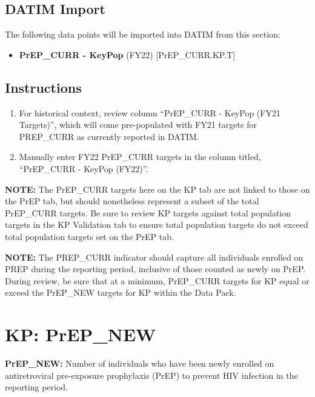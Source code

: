 \documentclass[
  openany]{book}
\providecommand{\tightlist}{%
  \setlength{\itemsep}{0pt}\setlength{\parskip}{0pt}}
\begin{document}
\hypertarget{datim-import-44}{%
\subsection{DATIM Import}\label{datim-import-44}}

The following data points will be imported into DATIM from this section:

\begin{itemize}
\tightlist
\item
  \textbf{PrEP\_CURR - KeyPop} (FY22) {[}PrEP\_CURR.KP.T{]}
\end{itemize}

\hypertarget{instructions-44}{%
\subsection{Instructions}\label{instructions-44}}

\begin{enumerate}
\def\labelenumi{\arabic{enumi}.}
\item
  For historical context, review column ``PrEP\_CURR - KeyPop (FY21
  Targets)'', which will come pre-populated with FY21 targets for
  PREP\_CURR as currently reported in DATIM.
\item
  Manually enter FY22 PrEP\_CURR targets in the column titled,
  ``PrEP\_CURR - KeyPop (FY22)''.
\end{enumerate}

\textbf{NOTE:} The PrEP\_CURR targets here on the KP tab are not linked to
those on the PrEP tab, but should nonetheless represent a subset of the
total PrEP\_CURR targets. Be sure to review KP targets against total
population targets in the KP Validation tab to ensure total population
targets do not exceed total population targets set on the PrEP tab.

\textbf{NOTE:} The PREP\_CURR indicator should capture all individuals
enrolled on PREP during the reporting period, inclusive of those counted
as newly on PrEP. During review, be sure that at a minimum, PrEP\_CURR
targets for KP equal or exceed the PrEP\_NEW targets for KP within the
Data Pack.

\hypertarget{kp-prep_new}{%
\section{KP: PrEP\_NEW}\label{kp-prep_new}}

\textbf{PrEP\_NEW:} Number of individuals who have been newly enrolled on
antiretroviral pre-exposure prophylaxis (PrEP) to prevent HIV infection
in the reporting period.
\end{document}
